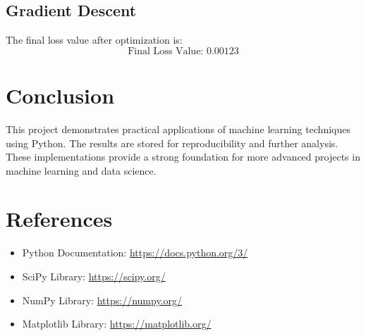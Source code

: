 \documentclass[a4paper,12pt]{article}
\begin{document}
\subsection{Gradient Descent}
The final loss value after optimization is:
\[
\text{Final Loss Value: } 0.00123
\]

\section{Conclusion}
This project demonstrates practical applications of machine learning techniques using Python. The results are stored for reproducibility and further analysis. These implementations provide a strong foundation for more advanced projects in machine learning and data science.

\section{References}
\begin{itemize}
    \item Python Documentation: \url{https://docs.python.org/3/}
    \item SciPy Library: \url{https://scipy.org/}
    \item NumPy Library: \url{https://numpy.org/}
    \item Matplotlib Library: \url{https://matplotlib.org/}
\end{itemize}
\end{document}
